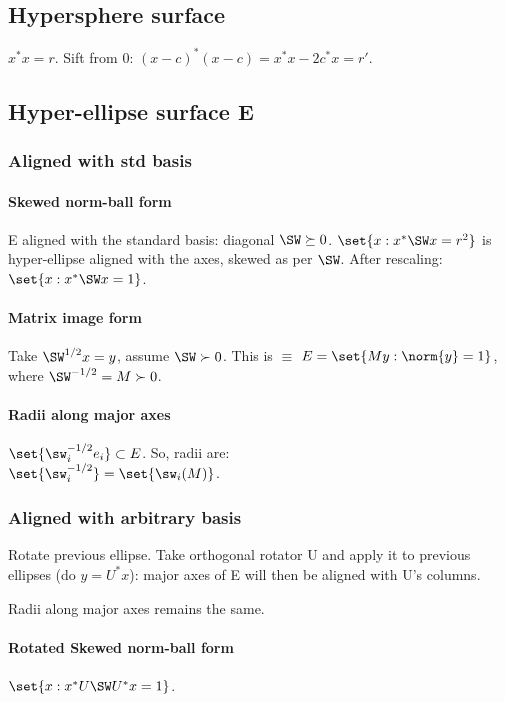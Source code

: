 \documentclass[oneside, article]{memoir}
\begin{document}
\subsection{Hypersphere surface}
$x^{*}x = r$. Sift from 0: $(x-c)^{*}(x-c) = x^{*}x - 2c^{*}x = r'$.

\subsection{Hyper-ellipse surface E}
\subsubsection{Aligned with std basis}
\paragraph*{Skewed norm-ball form}
E aligned with the standard basis: diagonal $\SW \succeq 0$. $\set{x: x^{*}\SW x = r^{2}}$ is hyper-ellipse aligned with the axes, skewed as per $\SW$. After rescaling: $\set{x: x^{*}\SW x = 1}$.

\paragraph*{Matrix image form}
Take $\SW^{1/2} x = y$, assume $\SW \succ 0$. This is $\equiv$ $E = \set{M y: \norm{y} = 1}$, where $\SW^{-1/2} = M \succ 0$.

\paragraph*{Radii along major axes}
$\set{\sw_i^{-1/2}e_i} \subset E$. So, radii are:\\ $\set{\sw_i^{-1/2}} = \set{\sw_i(M)}$.

\subsubsection{Aligned with arbitrary basis}
Rotate previous ellipse. Take orthogonal rotator U and apply it to previous ellipses (do $y = U^{*}x$): major axes of E will then be aligned with U's columns.

Radii along major axes remains the same.

\paragraph*{Rotated Skewed norm-ball form}
$\set{x: x^{*}U\SW U^{*}x = 1}$.
\end{document}
